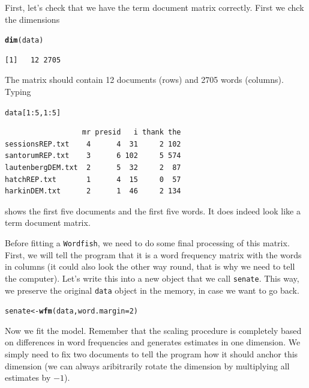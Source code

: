 \documentclass[10pt,a4paper]{article}\usepackage[]{graphicx}\usepackage[]{color}
\makeatletter
\newcommand{\hlnum}[1]{\textcolor[rgb]{0.686,0.059,0.569}{#1}}%
\newcommand{\hlopt}[1]{\textcolor[rgb]{0,0,0}{#1}}%
\newcommand{\hlstd}[1]{\textcolor[rgb]{0.345,0.345,0.345}{#1}}%
\newcommand{\hlkwb}[1]{\textcolor[rgb]{0.69,0.353,0.396}{#1}}%
\newcommand{\hlkwc}[1]{\textcolor[rgb]{0.333,0.667,0.333}{#1}}%
\newcommand{\hlkwd}[1]{\textcolor[rgb]{0.737,0.353,0.396}{\textbf{#1}}}%
\newenvironment{kframe}{%
 \def\at@end@of@kframe{}%
 \ifinner\ifhmode%
  \def\at@end@of@kframe{\end{minipage}}%
  \begin{minipage}{\columnwidth}%
 \fi\fi%
 \def\FrameCommand##1{\hskip\@totalleftmargin \hskip-\fboxsep
 \colorbox{shadecolor}{##1}\hskip-\fboxsep
     \hskip-\linewidth \hskip-\@totalleftmargin \hskip\columnwidth}%
 \MakeFramed {\advance\hsize-\width
   \@totalleftmargin\z@ \linewidth\hsize
   \@setminipage}}%
 {\par\unskip\endMakeFramed%
 \at@end@of@kframe}
\newenvironment{knitrout}{}{} %
\makeatother
\begin{document}
First, let's check that we have the term document matrix correctly. First we chck the dimensions
\begin{knitrout}
\color{fgcolor}\begin{kframe}
\begin{alltt}
\hlkwd{dim}\hlstd{(data)}
\end{alltt}
\begin{verbatim}
[1]   12 2705
\end{verbatim}
\end{kframe}
\end{knitrout}
The matrix should contain 12 documents (rows) and 2705 words (columns). Typing
\begin{knitrout}
\color{fgcolor}\begin{kframe}
\begin{alltt}
\hlstd{data[}\hlnum{1}\hlopt{:}\hlnum{5}\hlstd{,}\hlnum{1}\hlopt{:}\hlnum{5}\hlstd{]}
\end{alltt}
\begin{verbatim}
                  mr presid   i thank the
sessionsREP.txt    4      4  31     2 102
santorumREP.txt    3      6 102     5 574
lautenbergDEM.txt  2      5  32     2  87
hatchREP.txt       1      4  15     0  57
harkinDEM.txt      2      1  46     2 134
\end{verbatim}
\end{kframe}
\end{knitrout}
shows the first five documents and the first five words. It does indeed look like a term document matrix.

Before fitting a \texttt{Wordfish}, we need to do some final processing of this matrix. First, we will tell the program that it is a word frequency matrix with the words in columns (it could also look the other way round, that is why we need to tell the computer).  Let's write this into a new object that we call \texttt{senate}. This way, we preserve the original \texttt{data} object in the memory, in case we want to go back.
\begin{knitrout}
\color{fgcolor}\begin{kframe}
\begin{alltt}
\hlstd{senate} \hlkwb{<-} \hlkwd{wfm}\hlstd{(data,} \hlkwc{word.margin}\hlstd{=}\hlnum{2}\hlstd{)}
\end{alltt}
\end{kframe}
\end{knitrout}
Now we fit the model. Remember that the scaling procedure is completely based on differences in word frequencies and generates estimates in one dimension. We simply need to fix two documents to tell the program how it should anchor this dimension (we can always aribitrarily rotate the dimension by multiplying all estimates by $-1$). 
\end{document}
